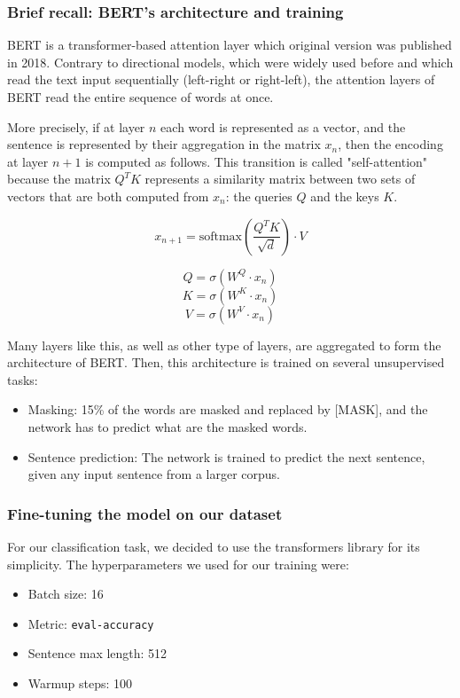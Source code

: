 \documentclass[final]{cvpr}
\begin{document}
\subsubsection{Brief recall: BERT's architecture and training}

BERT \cite{multilingualBert} is a transformer-based attention layer which original version was published in 2018. Contrary to directional models, which were widely used before and which read the text input sequentially (left-right or right-left), the attention layers of BERT read the entire sequence of words at once.

More precisely, if at layer $n$ each word is represented as a vector, and the sentence is represented by their aggregation in the matrix $x_n$, then the encoding at layer $n+1$ is computed as follows. This transition is called "self-attention" because the matrix $Q^TK$ represents a similarity matrix between two sets of vectors that are both computed from $x_n$: the queries $Q$ and the keys $K$.

$$
x_{n+1} = \text{softmax}\left( \frac{Q^TK}{\sqrt{d}}\right)\cdot V
$$

$$
Q = \sigma(W^Q\cdot x_n)
$$
$$
K = \sigma(W^K\cdot x_n)
$$
$$
V = \sigma(W^V\cdot x_n)
$$

Many layers like this, as well as other type of layers, are aggregated to form the architecture of BERT. Then, this architecture is trained on several unsupervised tasks:

\begin{itemize}
    \item Masking: 15\% of the words are masked and replaced by [MASK], and the network has to predict what are the masked words.
    \item Sentence prediction: The network is trained to predict the next sentence, given any input sentence from a larger corpus.
\end{itemize}

\subsubsection{Fine-tuning the model on our dataset}

For our classification task, we decided to use the transformers library \cite{transformersLib} for its simplicity. The hyperparameters we used for our training were:

\begin{itemize}
    \item Batch size: 16
    \item Metric: \texttt{eval-accuracy}
    \item Sentence max length: 512
    \item Warmup steps: 100
\end{itemize}
\end{document}
